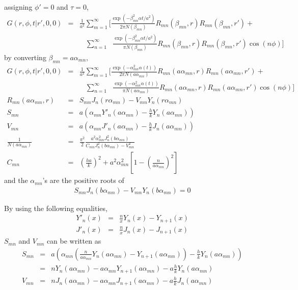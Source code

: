 \documentclass{article}
\begin{document}
assigning $\phi' = 0$ and $\tau = 0$,
\begin{eqnarray}
    G(r, \phi, t | r', 0, 0) &=&
    \frac{1}{a^2} \sum_{m=1}^{\infty} \Bigg[
    \frac{\exp(-\beta_{mn}^2\alpha t/a^2)}{2\pi N(\beta_{mn})}
    R_{mn}(\beta_{mn}, r) R_{mn}(\beta_{mn}, r') +
\nonumber\\
    & &\ \ \ \ \sum_{n=1}^{\infty}\ \ \ 
    \frac{\exp(-\beta_{mn}^2\alpha t/a^2)}{\pi N(\beta_{mn})}
    R_{mn}(\beta_{mn}, r) R_{mn}(\beta_{mn}, r')\cos(n\phi)\Bigg]
\end{eqnarray}
%
by converting $\beta_{mn} = a\alpha_{mn}$,
%
\begin{eqnarray}
    G(r, \phi, t | r', 0, 0) &=&
    \frac{1}{a^2} \sum_{m=1}^{\infty} \Bigg[
    \frac{\exp(-\alpha_{mn}^2\alpha(t))}{2\pi N(a\alpha_{mn})}
    R_{mn}(a\alpha_{mn}, r) R_{mn}(a\alpha_{mn}, r') +
\nonumber\\
    & &\ \ \ \ \sum_{n=1}^{\infty}\ \ \ 
    \frac{\exp(-\alpha_{mn}^2\alpha(t))}{\pi N(a\alpha_{mn})}
    R_{mn}(a\alpha_{mn}, r) R_{mn}(a\alpha_{mn}, r')\cos(n\phi)\Bigg]
\\
    R_{mn}(a\alpha_{mn}, r) &=& S_{mn}J_n(r\alpha_{mn}) - V_{mn}Y_n(r\alpha_{mn})
\\
    S_{mn} &=& a\left(\alpha_{mn}Y'_n(a\alpha_{mn}) - \frac{h}{k}Y_n(a\alpha_{mn})\right)
\\
    V_{mn} &=& a\left(\alpha_{mn}J'_n(a\alpha_{mn}) - \frac{h}{k}J_n(a\alpha_{mn})\right)
\\
    \frac{1}{N(a\alpha_{mn})} &=&
        \frac{\pi^2}{2} \frac{a^2\alpha_{mn}^2 J_n^2(b\alpha_{mn})}
        {C_{mn}J_n^2(b\alpha_{mn}) - V_{mn}^2}
\\
    C_{mn} &=& \left(\frac{ha}{k}\right)^2 + a^2\alpha_{mn}^2\left[1 - \left(\frac{n}{a\alpha_{mn}}\right)^2\right]
\end{eqnarray}
%
and the $\alpha_{mn}$'s are the positive roots of
%
\begin{eqnarray}
    S_{mn}J_n(b\alpha_{mn}) - V_{mn}Y_n(b\alpha_{mn}) = 0
\end{eqnarray}

By using the following equalities,
\begin{eqnarray}
    Y'_n(x) &=&  \frac{n}{x}Y_n(x) - Y_{n+1}(x) \\
    J'_n(x) &=&  \frac{n}{x}J_n(x) - J_{n+1}(x)
\end{eqnarray}
$S_{mn}$ and $V_{mn}$ can be written as
\begin{eqnarray}
    S_{mn} &=& a\left(\alpha_{mn}\left(\frac{n}{a\alpha_{mn}}Y_n(a\alpha_{mn}) - Y_{n+1}(a\alpha_{mn})\right) -
                      \frac{h}{k}Y_n(a\alpha_{mn})\right) \nonumber\\
           &=& nY_n(a\alpha_{mn}) - a\alpha_{mn}Y_{n+1}(a\alpha_{mn}) - a\frac{h}{k}Y_n(a\alpha_{mn}) \nonumber\\
    V_{mn} &=& nJ_n(a\alpha_{mn}) - a\alpha_{mn}J_{n+1}(a\alpha_{mn}) - a\frac{h}{k}J_n(a\alpha_{mn})
\end{eqnarray}
\end{document}
